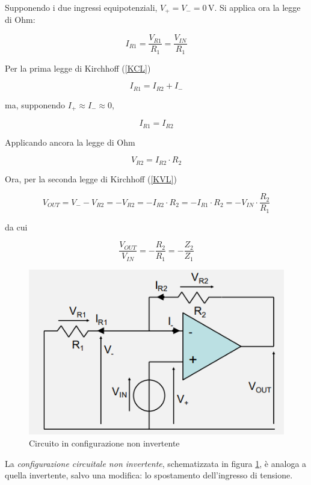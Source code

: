 \documentclass{article}
\begin{document}
\vspace{1mm}

Supponendo i due ingressi equipotenziali, $V_+ = V_- = 0\, \textrm{V}$. Si applica ora la legge di Ohm:

\[I_{R1} = \frac{V_{R1}}{R_1} = \frac{V_{IN}}{R_1}\]

Per la prima legge di Kirchhoff (\ref{KCL})

\[I_{R1} = I_{R2} + I_{-}\]

ma, supponendo $I_{+} \approx I_{-} \approx 0$,

\[I_{R1} = I_{R2}\]

Applicando ancora la legge di Ohm

\[V_{R2} = I_{R2} \cdot R_2\]

Ora, per la seconda legge di Kirchhoff (\ref{KVL})

\[V_{OUT} = V_- - V_{R2} = - V_{R2} = - I_{R2} \cdot R_2 = - I_{R1} \cdot R_{2} = - V_{IN} \cdot \frac{R_{2}}{R_{1}}\]

da cui 

\[\frac{V_{OUT}}{V_{IN}} = - \frac{R_2}{R_1} = - \frac{Z_2}{Z_1}\]

\clearpage
\begin{figure}[h]
  \centering
  \includegraphics[scale=0.7]{IM_circuito_non_invertente}
  \caption{Circuito in configurazione non invertente}
  \label{Schema_circuito_non_invertente}
\end{figure}

La \textit{configurazione circuitale non invertente}, schematizzata in figura \ref{Schema_circuito_non_invertente}, è analoga a quella invertente, salvo una modifica: lo spostamento dell'ingresso di tensione.

\vspace{1mm}
\end{document}
